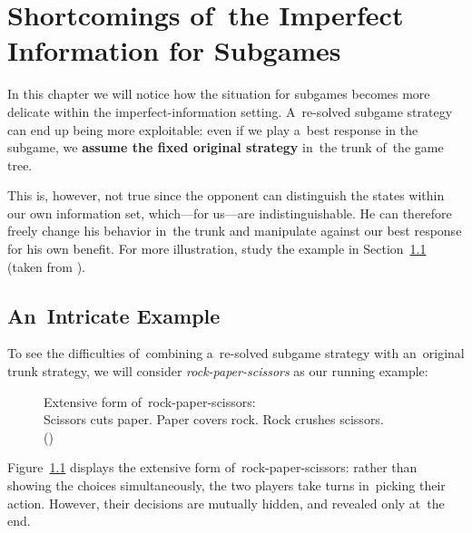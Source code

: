 \chapter{Shortcomings of~the Imperfect Information for Subgames}
In this chapter we will notice how the situation for subgames becomes more delicate within the imperfect-information setting.
A~re-solved subgame strategy can end up being more exploitable:
even if we play a~best response in the subgame, we \textbf{assume the fixed original strategy} in~the trunk of~the game tree.

This is, however, not true since the opponent can distinguish the states within our own information set, which---for us---are indistinguishable.
He can therefore freely change his behavior in~the trunk and manipulate against our best response for his own benefit.
For more illustration, study the example in Section~\ref{sec:intricate-ex} (taken from \cite{BurchJohansonBowling13}).

\section{An~Intricate Example}
\label{sec:intricate-ex}
To see the difficulties of~combining a~re-solved subgame strategy with an~original trunk strategy, we will consider \emph{rock-paper-scissors}\footnotemark{} as our running example:
\begin{figure}[H]
  \centering
  \scriptsize
  \def\svgwidth{.45\textwidth}
  
  \def\captionTitle{Extensive form of~rock-paper-scissors}
  \caption[\captionTitle]{\captionTitle:\\ Scissors cuts paper. Paper covers rock. Rock crushes scissors. \\(\cite{BurchJohansonBowling13})}
  \label{fig:game-tree-rock-paper-scissors}
\end{figure}

Figure~\ref{fig:game-tree-rock-paper-scissors} displays the extensive form of~rock-paper-scissors:
rather than showing the choices simultaneously, the two players take turns in~picking their action.
However, their decisions are mutually hidden, and revealed only at~the end.

